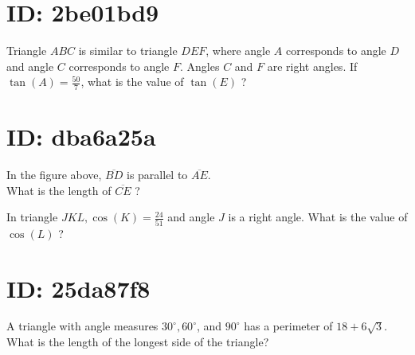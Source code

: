 \section*{ID: 2be01bd9}
Triangle $A B C$ is similar to triangle $D E F$, where angle $A$ corresponds to angle $D$ and angle $C$ corresponds to angle $F$. Angles $C$ and $F$ are right angles. If $\tan (A)=\frac{50}{7}$, what is the value of $\tan (E)$ ?

\section*{ID: dba6a25a}
In the figure above, $\overline{B D}$ is parallel to $\overline{A E}$.\\
What is the length of $\overline{C E}$ ?

In triangle $J K L, \cos (K)=\frac{24}{51}$ and angle $J$ is a right angle. What is the value of $\cos (L)$ ?

\section*{ID: 25da87f8}
A triangle with angle measures $30^{\circ}, 60^{\circ}$, and $90^{\circ}$ has a perimeter of $18+6 \sqrt{3}$.\\
What is the length of the longest side of the triangle?


